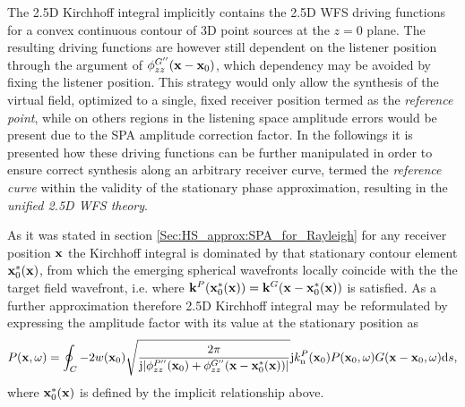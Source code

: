 The 2.5D Kirchhoff integral implicitly contains the 2.5D WFS driving functions for a convex continuous contour of 3D point sources at the $z = 0$ plane.
The resulting driving functions are however still dependent on the listener position through the argument of $\phi^{G''}_{zz}(\mathbf{x}-\mathbf{x}_0)$, which dependency may be avoided by fixing the listener position.
This strategy would only allow the synthesis of the virtual field, optimized to a single, fixed receiver position termed as the \emph{reference point}, while on others regions in the listening space amplitude errors would be present due to the SPA amplitude correction factor.
In the followings it is presented how these driving functions can be further manipulated in order to ensure correct synthesis along an arbitrary receiver curve, termed the \emph{reference curve} within the validity of the stationary phase approximation, resulting in the \emph{unified 2.5D WFS theory}.

\vspace{3mm}
As it was stated in section \ref{Sec:HS_approx:SPA_for_Rayleigh} for any receiver position $\mathbf{x}$ the Kirchhoff integral is dominated by that stationary contour element $\mathbf{x}_0^*(\mathbf{x})$, from which the emerging spherical wavefronts locally coincide with the the target field wavefront, i.e. where $\mathbf{k}^P(\mathbf{x}_0^*(\mathbf{x})) = \mathbf{k}^G(\mathbf{x} - \mathbf{x}_0^*(\mathbf{x}))$ is satisfied.
As a further approximation therefore 2.5D Kirchhoff integral may be reformulated by expressing the amplitude factor with its value at the stationary position as
\begin{equation}
P(\mathbf{x},\omega) = 
\oint_{C}
- 2 w(\mathbf{x}_0) 
\sqrt{\frac{2 \pi}{\mathrm{j} |\phi^{P''}_{zz}(\mathbf{x}_0) +\phi^{G''}_{zz}(\mathbf{x}-\mathbf{x}_0^*(\mathbf{x}))|}}
\mathrm{j} k_{\mathrm{n}}^P(\mathbf{x}_0) 	P(\mathbf{x}_0,\omega)
G(\mathbf{x}-\mathbf{x}_0,\omega) \mathrm{d} s,
\label{Eq:SFS_theory:25D_KI_appr}
\end{equation}
where $\mathbf{x}_0^*(\mathbf{x})$ is defined by the implicit relationship above.

